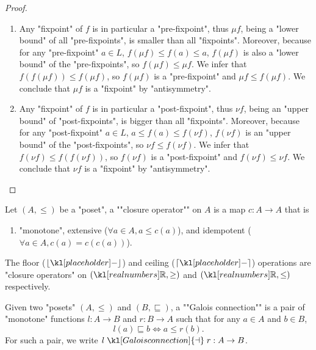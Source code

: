 \documentclass[main.tex]{subfiles}
\begin{document}
\begin{proof}
	\begin{enumerate}
		\item Any "fixpoint" of $f$ is in particular a "pre-fixpoint", thus $\mu f$, being a "lower bound" of all "pre-fixpoints", is smaller than all "fixpoints". Moreover, because for any "pre-fixpoint" $a\in L$, $f(\mu f) \leq f(a) \leq a$, $f(\mu f)$ is also a "lower bound" of the "pre-fixpoints", so $f(\mu f) \leq \mu f$. We infer that $f(f(\mu f)) \leq f(\mu f)$, so $f(\mu f)$ is a "pre-fixpoint" and $\mu f \leq f(\mu f)$. We conclude that $\mu f$ is a "fixpoint" by "antisymmetry".
		
		\item Any "fixpoint" of $f$ is in particular a "post-fixpoint", thus $\nu f$, being an "upper bound" of "post-fixpoints", is bigger than all "fixpoints". Moreover, because for any "post-fixpoint" $a\in L$, $a \leq f(a) \leq f(\nu f)$, $f(\nu f)$ is an "upper bound" of the "post-fixpoints", so $\nu f\leq f(\nu f)$. We infer that $f(\nu f) \leq f(f(\nu f))$, so $f(\nu f)$ is a "post-fixpoint" and $f(\nu f) \leq \nu f$. We conclude that $\nu f$ is a "fixpoint" by "antisymmetry".
	\end{enumerate}
\end{proof}
\begin{defn}
	\AP Let $(A, \leq)$ be a "poset", a ""closure operator"" on $A$ is a map $c: A \rightarrow A$ that is 
    \begin{enumerate}
        \item "monotone",
        \itemAP extensive ($\forall a \in A, a \leq c(a)$), and
        \itemAP idempotent ($\forall a \in A, c(a) = c(c(a))$).
    \end{enumerate}
\end{defn}
\begin{exmp}
    The floor ($\lfloor \placeholder \rfloor$) and ceiling ($\lceil \placeholder \rceil$) operations are "closure operators" on $(\R, \geq)$ and $(\R, \leq)$ respectively.
\end{exmp}
\begin{defn}
	\AP Given two "posets" $(A, \leq)$ and $(B, \sqsubseteq)$, a ""Galois connection"" is a pair of "monotone" functions $l: A \rightarrow B$ and $r: B\rightarrow A$ such that for any $a \in A$ and $b\in B$, \[l(a) \sqsubseteq b \Leftrightarrow a \leq r(b).\]
	For such a pair, we write $l \mathrel{\kl[Galois connection]{\dashv}} r:A\rightarrow B$.
\end{defn}
\end{document}
